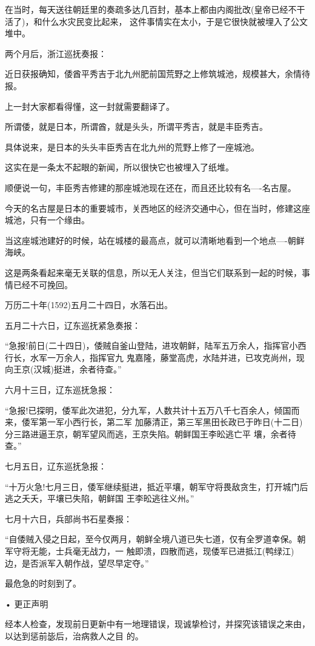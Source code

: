 \documentclass[11pt,a4paper,onecolumn]{article}
\begin{document}
在当时，每天送往朝廷里的奏疏多达几百封，基本上都由内阁批改(皇帝已经不干活了)，和什么水灾民变比起来，
这件事情实在太小，于是它很快就被埋入了公文堆中。

两个月后，浙江巡抚奏报：

近日获报确知，倭酋平秀吉于北九州肥前国荒野之上修筑城池，规模甚大，余情待报。

上一封大家都看得懂，这一封就需要翻译了。

所谓倭，就是日本，所谓酋，就是头头，所谓平秀吉，就是丰臣秀吉。

具体说来，是日本的头头丰臣秀吉在北九州的荒野上修了一座城池。

这实在是一条太不起眼的新闻，所以很快它也被埋入了纸堆。

顺便说一句，丰臣秀吉修建的那座城池现在还在，而且还比较有名----名古屋。

今天的名古屋是日本的重要城市，关西地区的经济交通中心，但在当时，修建这座城池，只有一个缘由。

当这座城池建好的时候，站在城楼的最高点，就可以清晰地看到一个地点----朝鲜海峡。

这是两条看起来毫无关联的信息，所以无人关注，但当它们联系到一起的时候，事情已经不可挽回。

万历二十年(1592)五月二十四日，水落石出。

五月二十六日，辽东巡抚紧急奏报：

``急报!前日(二十四日)，倭贼自釜山登陆，进攻朝鲜，陆军五万余人，指挥官小西行长，水军一万余人，指挥官九
鬼嘉隆，藤堂高虎，水陆并进，已攻克尚州，现向王京(汉城)挺进，余者待查。''

六月十三日，辽东巡抚急报：

``急报!已探明，倭军此次进犯，分九军，人数共计十五万八千七百余人，倾国而来，倭军第一军小西行长，第二军
加藤清正，第三军黑田长政已于昨日(十二日)分三路进逼王京，朝军望风而逃，王京失陷。朝鲜国王李昖逃亡平
壤，余者待查。''

七月五日，辽东巡抚急报：

``十万火急!七月三日，倭军继续挺进，抵近平壤，朝军守将畏敌贪生，打开城门后逃之夭夭，平壤已失陷，朝鲜国
王李昖逃往义州。''

七月十六日，兵部尚书石星奏报：

``自倭贼入侵之日起，至今仅两月，朝鲜全境八道已失七道，仅有全罗道幸保。朝军守将无能，士兵毫无战力，一
触即溃，四散而逃，现倭军已进抵江(鸭绿江)边，是否派军入朝作战，望尽早定夺。''

最危急的时刻到了。

• 更正声明

经本人检查，发现前日更新中有一地理错误，现诚挚检讨，并探究该错误之来由，以达到惩前毖后，治病救人之目
的。
\end{document}
